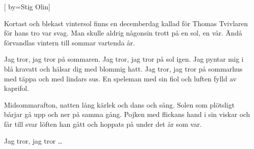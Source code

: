 


[ 	%
	by={Stig Olin}]		%
	
\beginverse*		%
Kortast och blekast vintersol
finns en decemberdag
kallad för Thomas Tvivlaren
för hans tro var svag.
Man skulle aldrig någonsin
trott på en sol, en vår.
Ändå förvandlas vintern till 
sommar vartenda år.
\endverse			%

\beginchorus
Jag tror, jag tror på sommaren.
Jag tror, jag tror på sol igen.
Jag pyntar mig i blå kravatt
och hälsar dig med blommig hatt.
Jag tror, jag tror på sommarhus
med täppa och med lindars sus.
En speleman med sin fiol
och luften fylld av kaprifol.
\endchorus

\beginverse*		%
Midsommarafton, natten lång
kärlek och dans och sång.
Solen som plötsligt bårjar gå
upp och ner på samma gång.
Pojken med flickans hand i sin
viskar och får till svar
löften han gått och hoppats på 
under det år som var.
\endverse			%

\beginchorus
Jag tror, jag tror …
\endchorus
\endsong			%
